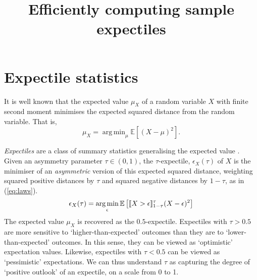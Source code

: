 \documentclass{article}
\title{Efficiently computing sample expectiles}
\DeclareMathOperator*{\argmin}{arg\,min}
\DeclarePairedDelimiter{\iv}{[\hspace{-1.5pt}[}{]\hspace{-1.5pt}]}
\newcommand{\expt}[2]{\epsilon_{#1}{(#2)}}
\begin{document}
\maketitle

\section{Expectile statistics}

It is well known that the expected value $\mu_X$ of a random variable $X$
with finite second moment minimises the expected squared distance from the
random variable. That is,
\begin{equation}
    \mu_X = \argmin_\mu
    \mathbb{E}\left[
        (X-\mu)^2\right
    ].
\end{equation}

\emph{Expectiles} are a class of summary statistics generalising the
expected value \cite{aigner1976estimation, newey1987asymmetric}.
Given an asymmetry parameter $\tau \in (0, 1)$,
the $\tau$-expectile, $\expt{X}{\tau}$ of $X$ is the minimiser of
an \emph{asymmetric} version of this expected squared distance, weighting
squared positive distances by $\tau$ and squared negative distances by
$1-\tau$, as in (\ref{eq:laws})\footnotemark.
\begin{equation}
    \label{eq:laws}
    \expt{X}{\tau} = \argmin_\epsilon
    \mathbb{E}\left[
        \iv{X > \epsilon}^{\tau}_{1-\tau}(X-\epsilon)^2
    \right]
\end{equation}
The expected value $\mu_X$ is recovered as the $0.5$-expectile.
Expectiles with $\tau > 0.5$ are more sensitive to `higher-than-expected'
outcomes than they are to `lower-than-expected' outcomes. In this sense,
they can be viewed as `optimistic' expectation values.
Likewise, expectiles with $\tau < 0.5$ can be viewed as `pessimistic'
expectations.
We can thus
understand $\tau$ as capturing the degree of `positive outlook' of an
expectile, on a scale from 0 to 1.
\end{document}
